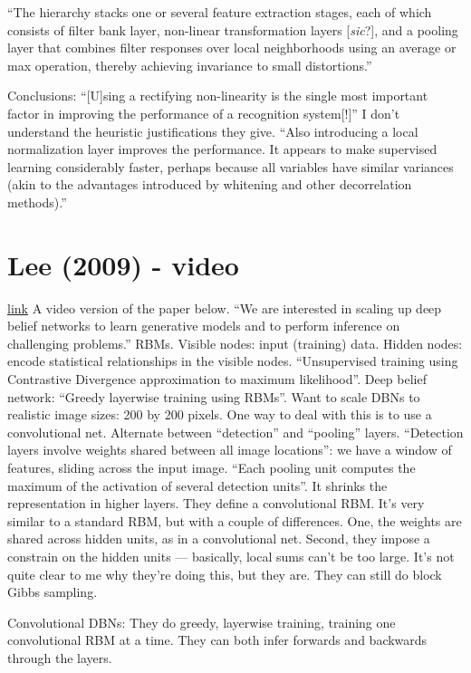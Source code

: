 \documentclass[12pt]{report}
\newcommand{\link}[2]{\href{#1}{#2}}
\begin{document}
``The hierarchy stacks one or several feature extraction stages, each
of which consists of filter bank layer, non-linear transformation
layers [\emph{sic}?], and a pooling layer that combines filter
responses over local neighborhoods using an average or max operation,
thereby achieving invariance to small distortions.''



Conclusions: ``[U]sing a rectifying non-linearity is the single most
important factor in improving the performance of a recognition
system[!]''  I don't understand the heuristic justifications they
give. ``Also introducing a local normalization layer improves the
performance.  It appears to make supervised learning considerably
faster, perhaps because all variables have similar variances (akin to
the advantages introduced by whitening and other decorrelation
methods).''

\section{Lee (2009) - video}

\link{http://videolectures.net/icml09\_lee\_cdb/}{link} A video
version of the paper below.  ``We are interested in scaling up deep
belief networks to learn generative models and to perform inference on
challenging problems.''  RBMs.  Visible nodes: input (training) data.
Hidden nodes: encode statistical relationships in the visible nodes.
``Unsupervised training using Contrastive Divergence approximation to
maximum likelihood''.  Deep belief network: ``Greedy layerwise
training using RBMs''.  Want to scale DBNs to realistic image sizes:
200 by 200 pixels.  One way to deal with this is to use a
convolutional net.  Alternate between ``detection'' and ``pooling''
layers.  ``Detection layers involve weights shared between all image
locations'': we have a window of features, sliding across the input
image.  ``Each pooling unit computes the maximum of the activation of
several detection units''.  It shrinks the representation in higher
layers.  They define a convolutional RBM.  It's very similar to a
standard RBM, but with a couple of differences.  One, the weights are
shared across hidden units, as in a convolutional net.  Second, they
impose a constrain on the hidden units --- basically, local sums can't
be too large.  It's not quite clear to me why they're doing this, but
they are.  They can still do block Gibbs sampling.  

Convolutional DBNs: They do greedy, layerwise training, training one
convolutional RBM at a time.  They can both infer forwards and
backwards through the layers.
\end{document}
